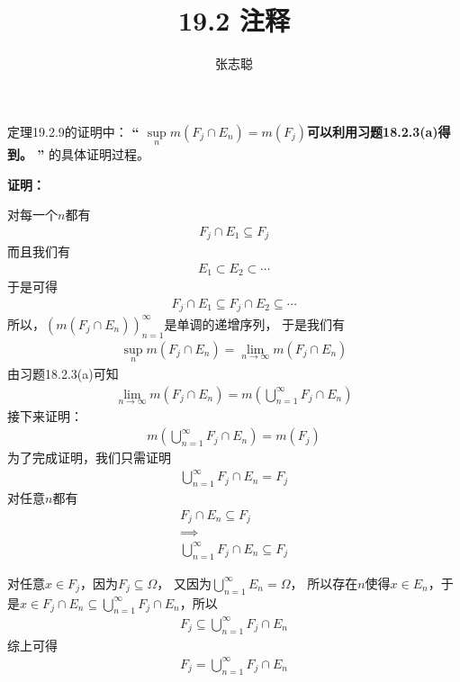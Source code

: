 \documentclass{article}
\begin{document}
\title{19.2 注释}
\author{张志聪}
\maketitle

\begin{zremark}
  定理19.2.9的证明中：
  \textbf{“
    $\sup\limits_{n} m(F_j \cap E_n) = m(F_j)$可以利用习题18.2.3(a)得到。
    ”}
  的具体证明过程。
\end{zremark}

\textbf{证明：}

对每一个$n$都有
\begin{align*}
  F_j \cap E_1 \subseteq F_j
\end{align*}
而且我们有
\begin{align*}
  E_1 \subset E_2  \subset \cdots
\end{align*}
于是可得
\begin{align*}
  F_j \cap E_1 \subseteq F_j \cap E_2 \subseteq \cdots
\end{align*}
所以，$(m(F_j \cap E_n))_{n = 1}^\infty$是单调的递增序列，
于是我们有
\begin{align*}
  \sup\limits_{n} m(F_j \cap E_n) = \lim\limits_{n \to \infty} m(F_j \cap E_n)
\end{align*}
由习题18.2.3(a)可知
\begin{align*}
  \lim\limits_{n \to \infty} m(F_j \cap E_n) = m(\bigcup\limits_{n = 1}^\infty F_j \cap E_n)
\end{align*}
接下来证明：
\begin{align*}
  m(\bigcup\limits_{n = 1}^\infty F_j \cap E_n) = m(F_j)
\end{align*}
为了完成证明，我们只需证明
\begin{align*}
  \bigcup\limits_{n = 1}^\infty F_j \cap E_n = F_j
\end{align*}
对任意$n$都有
\begin{align*}
  F_j \cap E_n \subseteq F_j \\
  \implies                   \\
  \bigcup\limits_{n = 1}^\infty F_j \cap E_n \subseteq F_j
\end{align*}

对任意$x \in F_j$，因为$F_j \subseteq \Omega$，
又因为$\bigcup\limits_{n = 1}^\infty E_n = \Omega$，
所以存在$n$使得$x \in E_n$，于是$x \in F_j \cap E_n \subseteq \bigcup\limits_{n = 1}^\infty F_j \cap E_n$，所以
\begin{align*}
  F_j \subseteq \bigcup\limits_{n = 1}^\infty F_j \cap E_n
\end{align*}
综上可得
\begin{align*}
  F_j = \bigcup\limits_{n = 1}^\infty F_j \cap E_n
\end{align*}
\end{document}
